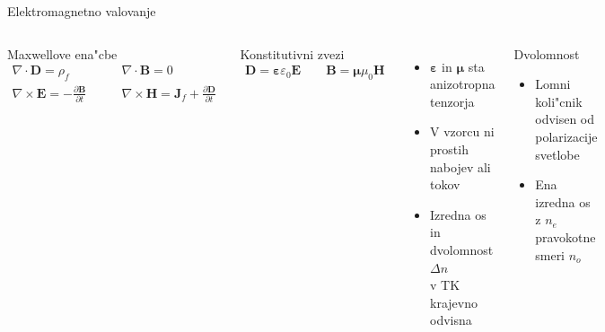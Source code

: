 \documentclass{beamer}
\newcommand{\odvod}[2]{\frac{\partial #1}{\partial #2}}
\renewcommand{\vec}{\mathbf}
\newcommand{\eps}{\varepsilon}
\begin{document}
\begin{frame}{Elektromagnetno valovanje}
\begin{columns}

 
\begin{block}{Maxwellove ena"cbe}
\begin{equation*}
\begin{aligned}
 \nabla \cdot \vec D = \rho_f & \qquad \nabla \cdot \vec B = 0 \\
 \nabla \times \vec E = -\odvod{\vec B}{t} & \qquad \nabla \times \vec H = \vec J_f + \odvod{\vec D}{t}
\end{aligned} 
\end{equation*}
\end{block}

\begin{block}{Konstitutivni zvezi}
\begin{equation*}
\begin{aligned}
\vec D = \boldsymbol\varepsilon \varepsilon_0 \vec E \qquad \vec B = \boldsymbol \mu \mu_0 \vec H
\end{aligned} 
\end{equation*}
\end{block}

\begin{itemize}
 \item $\boldsymbol\eps$ in $\boldsymbol\mu$ sta anizotropna tenzorja
 \item V vzorcu ni prostih nabojev ali tokov
 \item Izredna os in dvolomnost $\Delta n$ \\ v TK krajevno odvisna
\end{itemize}

\begin{block}{Dvolomnost}
\begin{itemize}
 \item Lomni koli"cnik odvisen od polarizacije svetlobe
 \item Ena izredna os z $n_e$ pravokotne smeri $n_o$
\end{itemize}
\end{block}


\end{columns}
\end{frame}
\end{document}
